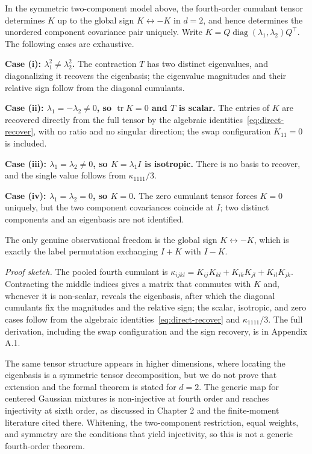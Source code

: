 \begin{theorem}\label{thm:pointid}
In the symmetric two-component model above, the fourth-order cumulant tensor determines $K$ up to the global sign $K\leftrightarrow-K$ in $d=2$, and hence determines the unordered component covariance pair uniquely. Write $K=Q\operatorname{diag}(\lambda_1,\lambda_2)Q^\top$. The following cases are exhaustive.

\textbf{Case (i): $\lambda_1^2\ne\lambda_2^2$.} The contraction $T$ has two distinct eigenvalues, and diagonalizing it recovers the eigenbasis; the eigenvalue magnitudes and their relative sign follow from the diagonal cumulants.

\textbf{Case (ii): $\lambda_1=-\lambda_2\ne0$, so $\operatorname{tr}K=0$ and $T$ is scalar.} The entries of $K$ are recovered directly from the full tensor by the algebraic identities~\eqref{eq:direct-recover}, with no ratio and no singular direction; the swap configuration $K_{11}=0$ is included.

\textbf{Case (iii): $\lambda_1=\lambda_2\ne0$, so $K=\lambda_1 I$ is isotropic.} There is no basis to recover, and the single value follows from $\kappa_{1111}/3$.

\textbf{Case (iv): $\lambda_1=\lambda_2=0$, so $K=0$.} The zero cumulant tensor forces $K=0$ uniquely, but the two component covariances coincide at $I$; two distinct components and an eigenbasis are not identified.

The only genuine observational freedom is the global sign $K\leftrightarrow-K$, which is exactly the label permutation exchanging $I+K$ with $I-K$.
\end{theorem}

\emph{Proof sketch.} The pooled fourth cumulant is
\(\kappa_{ijkl}=K_{ij}K_{kl}+K_{ik}K_{jl}+K_{il}K_{jk}\). Contracting
the middle indices gives a matrix that commutes with \(K\) and, whenever
it is non-scalar, reveals the eigenbasis, after which the diagonal
cumulants fix the magnitudes and the relative sign; the scalar,
isotropic, and zero cases follow from the algebraic
identities~\eqref{eq:direct-recover} and
\(\kappa_{1111}/3\). The full derivation, including the swap
configuration and the sign recovery, is in Appendix A.1.

The same tensor structure appears in higher dimensions, where locating
the eigenbasis is a symmetric tensor decomposition, but we do not prove
that extension and the formal theorem is stated for \(d=2\). The generic
map for centered Gaussian mixtures is non-injective at fourth order and
reaches injectivity at sixth order, as discussed in Chapter 2 and the
finite-moment literature cited there. Whitening, the two-component
restriction, equal weights, and symmetry are the conditions that yield
injectivity, so this is not a generic fourth-order theorem.

